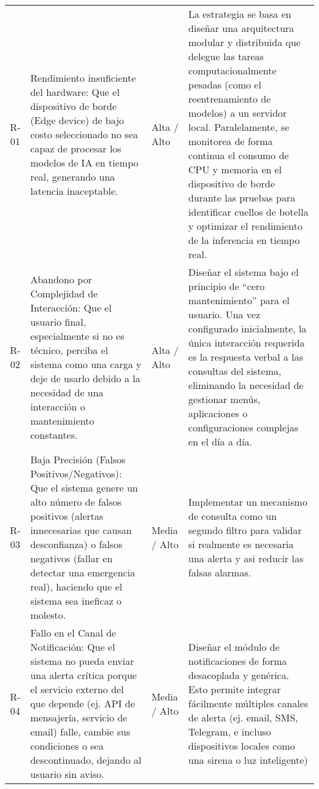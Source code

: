 {\begin{longtable}[c]{c p{5.8cm} >{\centering\arraybackslash}p{2cm} p{5.8cm}}
      R-01 & Rendimiento insuficiente del hardware: Que el dispositivo de borde (Edge device) de bajo costo seleccionado no sea capaz de procesar los modelos de IA en tiempo real, generando una latencia inaceptable.                                                        & Alta / Alto            & La estrategia se basa en diseñar una arquitectura modular y distribuida que delegue las tareas computacionalmente pesadas (como el reentrenamiento de modelos) a un servidor local. Paralelamente, se monitorea de forma continua el consumo de CPU y memoria en el dispositivo de borde durante las pruebas para identificar cuellos de botella y optimizar el rendimiento de la inferencia en tiempo real.                                               \\
      \addlinespace
      R-02 & Abandono por Complejidad de Interacción: Que el usuario final, especialmente si no es técnico, perciba el sistema como una carga y deje de usarlo debido a la necesidad de una interacción o mantenimiento constantes.                                            & Alta / Alto            & Diseñar el sistema bajo el principio de ``cero mantenimiento'' para el usuario. Una vez configurado inicialmente, la única interacción requerida es la respuesta verbal a las consultas del sistema, eliminando la necesidad de gestionar menús, aplicaciones o configuraciones complejas en el día a día.                                                                                                                                                  \\
      \addlinespace
      R-03 & Baja Precisión (Falsos Positivos/Negativos): Que el sistema genere un alto número de falsos positivos (alertas innecesarias que causan desconfianza) o falsos negativos (fallar en detectar una emergencia real), haciendo que el sistema sea ineficaz o molesto. & Media / Alto           & Implementar un mecanismo de consulta como un segundo filtro para validar si realmente es necesaria una alerta y asi reducir las falsas alarmas.                                                                                                                                                                                                                                                                                                            \\
      \addlinespace
      R-04 & Fallo en el Canal de Notificación: Que el sistema no pueda enviar una alerta crítica porque el servicio externo del que depende (ej. API de mensajería, servicio de email) falle, cambie sus condiciones o sea descontinuado, dejando al usuario sin aviso.       & Media / Alto           & Diseñar el módulo de notificaciones de forma desacoplada y genérica. Esto permite integrar fácilmente múltiples canales de alerta (ej. email, SMS, Telegram, e incluso dispositivos locales como una sirena o luz inteligente)                                                                                                                                                                                                                             \\

\end{longtable}}

